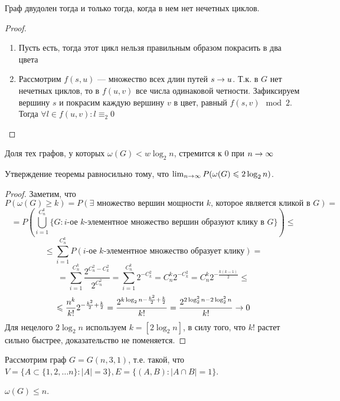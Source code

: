 \begin{proposition}
    Граф двудолен тогда и только тогда, когда в нем нет нечетных циклов.
\end{proposition}
\begin{proof}
    \begin{enumerate}
        \item[\(\Ra\)] Пусть есть, тогда этот цикл нельзя правильным образом покрасить в два цвета
        \item[\(\La\)] Рассмотрим \(f(s, u)\) --- множество всех длин путей \(s \rightarrow u\). Т.к. в \(G\) нет нечетных циклов, то в \(f(u, v)\) все числа одинаковой четности. Зафиксируем вершину \(s\) и покрасим каждую вершину \(v\) в цвет, равный \(f(s, v) \mod 2\). Тогда \(\forall l \in f(u, v): l \equiv_2 0\)
    \end{enumerate}
\end{proof}

\begin{theorem}
    Доля тех графов, у которых \(\omega(G) < w\log_2 n\), стремится к \(0\) при \(n \rightarrow \infty\)
\end{theorem}
\begin{note}
    Утверждение теоремы равносильно тому, что \(\lim_{n \rightarrow \infty} P(\omega(G) \leqslant 2 \log_2 n)\).
\end{note}
\begin{proof}
    Заметим, что
    \[P(\omega(G) \ge k) = P(\exists \text{ множество вершин мощности \(k\), которое является кликой в \(G\)}) =\]
    \[ = P\left(\bigcup_{i = 1}^{C_n^k} \{G: \text{\(i\)-ое \(k\)-элементное множество вершин образуют клику в \(G\)}\}\right) \le\]
    \[\le \sum_{i = 1}^{C_n^k}P(\text{\(i\)-ое \(k\)-элементное множество образует клику}) = \]
    \[= \sum_{i = 1}^{C_n^k} \frac{2^{C_n^2 - C_k^2}}{2^{C_n^2}} = \sum_{i = 1}^{C_n^k} 2^{-C_k^2} = C_n^k 2^{-C_k^2} = C_n^k2^{-\frac{k(k - 1)}{2}} \le\]
    \[\leqslant \frac{n^k}{k!}2^{-\frac{k^2}{2} + \frac{k}{2}} = \frac{2^{k\log_2 n - \frac{k^2}{2} + \frac{k}{2}}}{k!} = \frac{2^{2\log_2^2n - 2\log_2^2n}}{k!} \rightarrow 0\]
    Для нецелого \(2\log_2n\) используем \(k = [2\log_2n]\), в силу того, что \(k!\) растет сильно быстрее, доказательство не поменяется.
\end{proof}

Рассмотрим граф \(G = G(n, 3, 1)\), т.е. такой, что \(V = \{A \subset \{1, 2, \dots n\}: |A| = 3\}, E = \{(A, B): |A \cap B| = 1\}\).

\begin{proposition}
    \(\omega(G) \le n\).
\end{proposition}

